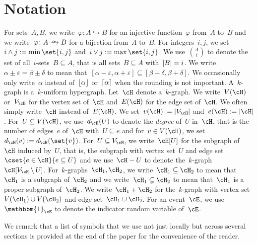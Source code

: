 \documentclass[11pt]{amsart}
\newcommand{\eps}{\varepsilon}
\DeclarePairedDelimiter{\abs}{\lvert}{\rvert}
\DeclarePairedDelimiter{\floor}{\lfloor}{\rfloor}
\DeclarePairedDelimiter{\ceil}{\lceil}{\rceil}
\newcommand{\ind}{\mathbbm{1}}
\def\phi{\varphi}
\newcommand{\injection}{\hookrightarrow}
\newcommand{\bijection}{\mathchoice
	{\xrightarrow{\smash{\raisebox{-3pt}{$\scriptstyle\sim$}}}}%
	{\xrightarrow{\smash{\raisebox{-3pt}{$\scriptstyle\sim$}}}}%
	{\xrightarrow{\smash{\raisebox{-2.5pt}{$\scriptscriptstyle\sim$}}}}%
	{\xrightarrow{\smash{\raisebox{-2.5pt}{$\scriptscriptstyle\sim$}}}}%
}
\theoremstyle{definition}
\numberwithin{equation}{section}
\begin{document}
	\section{Notation}\label{section: notation}
	
	For sets~$A,B$, we write~$\phi\colon A\injection B$ for an injective function~$\phi$ from~$A$ to~$B$ and we write~$\phi\colon A\bijection B$ for a bijection from~$A$ to~$B$.
	For integers~$i,j$, we set~$i\wedge j:=\min\set{i,j}$ and~$i\vee j:=\max\set{i,j}$.
	We use~$\binom{A}{i}$ to denote the set of all~$i$-sets~$B\subseteq A$, that is all sets~$B\subseteq A$ with~$\abs{B}=i$.
	We write~$\alpha\pm\eps=\beta\pm\delta$ to mean that~$[\alpha-\eps,\alpha+\eps]\subseteq [\beta-\delta,\beta+\delta]$.
	We occasionally only write~$\alpha$ instead of~$\floor{\alpha}$ or~$\ceil{\alpha}$ when the rounding is not important.
	A~$k$-graph is a~$k$-uniform hypergraph.
	Let~$\cH$ denote a~$k$-graph.
	We write~$V(\cH)$ or~$V_\cH$ for the vertex set of~$\cH$ and~$E(\cH)$ for the edge set of~$\cH$.
	We often simply write~$\cH$ instead of~$E(\cH)$.
	We set~$v(\cH):=\abs{V_\cH}$ and~$e(\cH):=\abs{\cH}$.
	For~$U\subseteq V(\cH)$, we use~$d_\cH(U)$ to denote the \emph{degree} of~$U$ in~$\cH$, that is the number of edges~$e$ of~$\cH$ with~$U\subseteq e$ and for~$v\in V(\cH)$, we set~$d_\cH(v):=d_\cH(\set{v})$.
	For~$U\subseteq V_\cH$, we write~$\cH[U]$ for the subgraph of~$\cH$ induced by~$U$, that is, the subgraph with vertex set~$U$ and edge set~$\cset{ e\in\cH }{ e\subseteq U }$ and we use~$\cH-U$ to denote the~$k$-graph~$\cH[V_\cH\setminus U]$.
	For~$k$-graphs~$\cH_1,\cH_2$, we write~$\cH_1\subseteq\cH_2$ to mean that~$\cH_1$ is a subgraph of~$\cH_2$ and we write~$\cH_1\subsetneq\cH_2$ to mean that~$\cH_1$ is a proper subgraph of~$\cH_2$.
	We write~$\cH_1+\cH_2$ for the~$k$-graph with vertex set~$V(\cH_1)\cup V(\cH_2)$ and edge set~$\cH_1\cup\cH_2$.
	For an event~$\cE$, we use~$\ind_\cE$ to denote the indicator random variable of~$\cE$.
	
	We remark that a list of symbols that we use not just locally but across several sections is provided at the end of the paper for the convenience of the reader.
	

	
	
	
\end{document}
